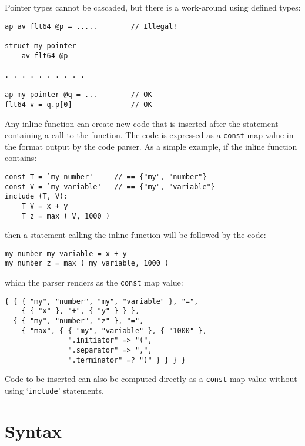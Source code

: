 \documentclass[12pt]{article}
\newenvironment{indpar}[1][0.3in]%
	{\begin{list}{}%
		     {\setlength{\itemsep}{0in}%
		      \setlength{\topsep}{0in}%
		      \setlength{\parsep}{1ex}%
		      \setlength{\labelwidth}{#1}%
		      \setlength{\leftmargin}{#1}%
		      \addtolength{\leftmargin}{\labelsep}}%
	 \item}%
	{\end{list}}
\begin{document}
Pointer types cannot be cascaded, but there is a work-around
using defined types:
\begin{indpar}\begin{verbatim}
ap av flt64 @p = .....        // Illegal!

struct my pointer
    av flt64 @p

. . . . . . . . . .

ap my pointer @q = ...        // OK
flt64 v = q.p[0]              // OK
\end{verbatim}\end{indpar}

Any inline function can create new code that is inserted
after the statement containing a call to the function.
The code is expressed as a {\tt const} map value in
the format output by the code parser.  As a simple
example, if the inline function contains:
\begin{indpar}\begin{verbatim}
const T = `my number'     // == {"my", "number"}
const V = `my variable'   // == {"my", "variable"}
include (T, V):
    T V = x + y
    T z = max ( V, 1000 )
\end{verbatim}\end{indpar}
then a statement calling the inline function will be
followed by the code:
\begin{indpar}\begin{verbatim}
my number my variable = x + y
my number z = max ( my variable, 1000 )
\end{verbatim}\end{indpar}
which the parser renders as the {\tt const} map value:
\begin{indpar}\begin{verbatim}
{ { { "my", "number", "my", "variable" }, "=",
    { { "x" }, "+", { "y" } } },
  { { "my", "number", "z" }, "=",
    { "max", { { "my", "variable" }, { "1000" },
               ".initiator" => "(",
               ".separator" => ",",
               ".terminator" =? ")" } } } }
\end{verbatim}\end{indpar}

Code to be inserted can also be computed directly as a {\tt const} map
value without using `{\tt include}' statements.




\section{Syntax}
\end{document}
